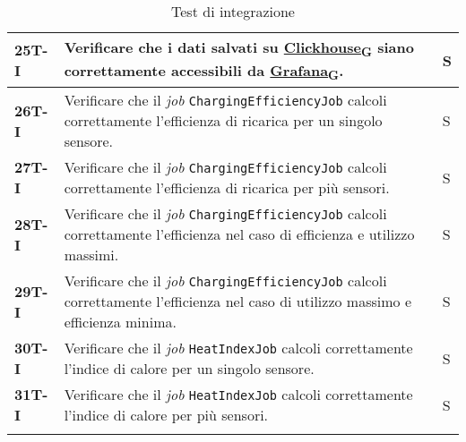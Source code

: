 \begin{longtable}{|>{\raggedright\arraybackslash}m{}|>{\raggedright\arraybackslash}m{}|>{\raggedright\arraybackslash}m{}|}
	\hline
	\textbf{25T-I}  & Verificare che i dati salvati su \href{https://7last.github.io/docs/rtb/documentazione-interna/glossario\#clickhouse}{Clickhouse\textsubscript{G}} siano correttamente accessibili da \href{https://7last.github.io/docs/rtb/documentazione-interna/glossario\#grafana}{Grafana\textsubscript{G}}.                                  & S              \\
	\hline
	\multicolumn{3}{|c|}{\textbf{Apache Flink}}
	\hline
	\textbf{26T-I}  & Verificare che il \textit{job} \texttt{ChargingEfficiencyJob} calcoli correttamente l'efficienza di ricarica per un singolo sensore.                                                                                                                                                                                                & S              \\
	\hline
	\textbf{27T-I}  & Verificare che il \textit{job} \texttt{ChargingEfficiencyJob} calcoli correttamente l'efficienza di ricarica per più sensori.                                                                                                                                                                                                       & S              \\
	\hline
	\textbf{28T-I}  & Verificare che il \textit{job} \texttt{ChargingEfficiencyJob} calcoli correttamente l'efficienza nel caso di efficienza e utilizzo massimi.                                                                                                                                                                                         & S              \\
	\hline
	\textbf{29T-I}  & Verificare che il \textit{job} \texttt{ChargingEfficiencyJob} calcoli correttamente l'efficienza nel caso di utilizzo massimo e efficienza minima.                                                                                                                                                                                  & S              \\
	\hline
	\textbf{30T-I}  & Verificare che il \textit{job} \texttt{HeatIndexJob} calcoli correttamente l'indice di calore per un singolo sensore.                                                                                                                                                                                                               & S              \\
	\hline
	\textbf{31T-I}  & Verificare che il \textit{job} \texttt{HeatIndexJob} calcoli correttamente l'indice di calore per più sensori.                                                                                                                                                                                                                      & S              \\
	\hline
	\caption{Test di integrazione}
\end{longtable}

